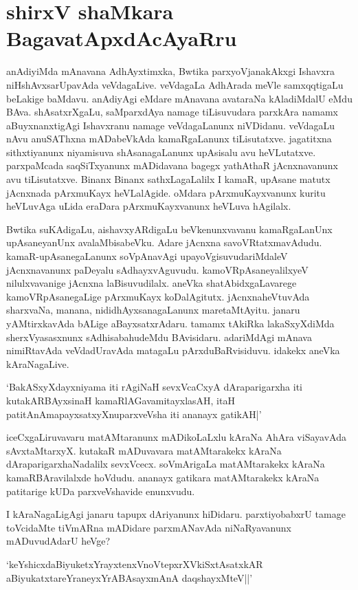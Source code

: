 \chapter{shirxV shaMkara BagavatApxdAcAyaRru}\label{chap3}

anAdiyiMda mAnavana AdhAyxtimxka, Bwtika parxyoVjanakAkxgi Ishavxra niHshAvxsarUpavAda veVdagaLive. veVdagaLa AdhArada meVle samxqqtigaLu beLakige baMdavu. anAdiyAgi eMdare mAnavana avataraNa kAladiMdalU eMdu BAva. shAsatxrXgaLu, saMparxdAya namage tiLisuvudara parxkAra namamx aBuyxnanxtigAgi Ishavxranu namage veVdagaLanunx niVDidanu. veVdagaLu nAvu anuSAThxna mADabeVkAda kamaRgaLanunx tiLisutatxve. jagatitxna sithxtiyanunx niyamisuva shAsanagaLanunx upAsisalu avu heVLutatxve. parxpaMcada saqSiTxyanunx mADidavana bagegx yathAthaR jAcnxnavanunx avu tiLisutatxve. Binanx Binanx sathxLagaLalilx I kamaR, upAsane matutx jAcnxnada pArxmuKayx heVLalAgide. oMdara pArxmuKayxvanunx kuritu heVLuvAga uLida eraDara pArxmuKayxvanunx heVLuva hAgilalx.

Bwtika suKAdigaLu, aishavxyARdigaLu beVkenunxvavanu kamaRgaLanUnx upAsaneyanUnx avalaMbisabeVku. Adare jAcnxna savoVRtatxmavAdudu. kamaR-upAsanegaLanunx soVpAnavAgi upayoVgisuvudariMdaleV jAcnxnavanunx paDeyalu sAdhayxvAguvudu. kamoVRpAsaneyalilxyeV nilulxvavanige jAcnxna laBisuvudilalx. aneVka shatAbidxgaLavarege kamoVRpAsanegaLige pArxmuKayx koDalAgitutx. jAcnxnaheVtuvAda sharxvaNa, manana, nididhAyxsanagaLanunx maretaMtAyitu. janaru yAMtirxkavAda bALige aBayxsatxrAdaru. tamamx tAkiRka lakaSxyXdiMda sherxVyasasxnunx sAdhisabahudeMdu BAvisidaru. adariMdAgi mAnava nimiRtavAda veVdadUravAda matagaLu pArxduBaRvisiduvu. idakekx aneVka kAraNagaLive.

`BakASxyXdayxniyama iti rAgiNaH sevxVcaCxyA dAraparigarxha iti kutakARBAyxsinaH kamaRlAGavamitayxlasAH, itaH patitAnAmapayxsatxyXnuparxveVsha iti ananayx gatikAH|'

iceCxgaLiruvavaru matAMtaranunx mADikoLaLxlu kAraNa AhAra viSayavAda sAvxtaMtarxyX. kutakaR mADuvavara matAMtarakekx kAraNa dAraparigarxhaNadalilx sevxVcecx. soVmArigaLa matAMtarakekx kAraNa kamaRBAravilalxde hoVdudu. ananayx gatikara matAMtarakekx kAraNa patitarige kUDa parxveVshavide enunxvudu.

I kAraNagaLigAgi janaru tapupx dAriyanunx hiDidaru. parxtiyobabxrU tamage toVcidaMte tiVmARna mADidare parxmANavAda niNaRyavanunx mADuvudAdarU heVge?

\begin{shloka}
`keYshicxdaBiyuketxYrayxtenxVnoVtepxrXVkiSxtAsatxkAR\\
aBiyukatxtareYraneyxYrABAsayxmAnA daqshayxMteV||'
\end{shloka}


